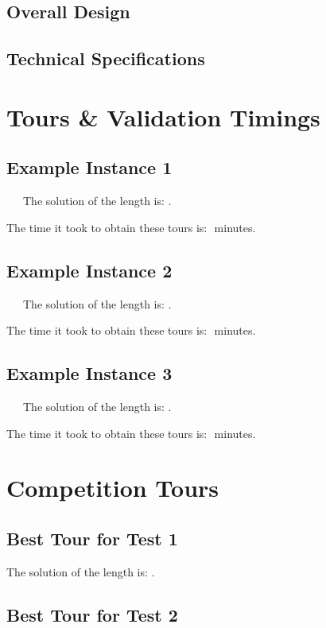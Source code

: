 \documentclass[11pt]{scrreprt}
\begin{document}
\section{Overall Design}

\section{Technical Specifications}

\chapter{Tours \& Validation Timings}
\section{Example Instance 1}

\ \ \ The solution of the length is: $ $.

The time it took to obtain these tours is: $ $ minutes.


\section{Example Instance 2}

\ \ \ The solution of the length is: $ $.

The time it took to obtain these tours is: $ $ minutes.


\section{Example Instance 3}

\ \ \ The solution of the length is: $ $.

The time it took to obtain these tours is: $ $ minutes.

\chapter{Competition Tours}
\section{Best Tour for Test 1}

The solution of the length is: $ $.


\section{Best Tour for Test 2}
\end{document}
